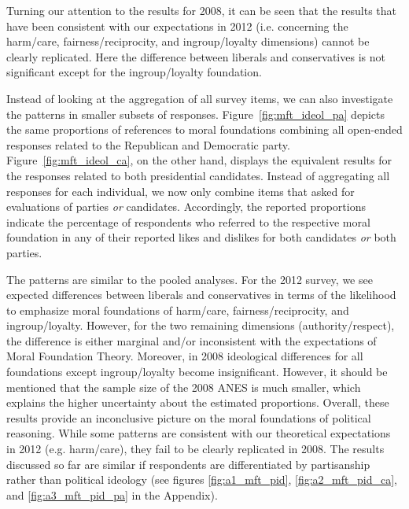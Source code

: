 \documentclass[12pt]{article}
\begin{document}
Turning our attention to the results for 2008, it can be seen that the results that have been consistent with our expectations in 2012 (i.e. concerning the harm/care, fairness/reciprocity, and ingroup/loyalty dimensions) cannot be clearly replicated. Here the difference between liberals and conservatives is not significant except for the ingroup/loyalty foundation.

Instead of looking at the aggregation of all survey items, we can also investigate the patterns in smaller subsets of responses. Figure~\ref{fig:mft_ideol_pa} depicts the same proportions of references to moral foundations combining all open-ended responses related to the Republican and Democratic party. Figure~\ref{fig:mft_ideol_ca}, on the other hand, displays the equivalent results for the responses related to both presidential candidates. Instead of aggregating all responses for each individual, we now only combine items that asked for evaluations of parties \textit{or} candidates. Accordingly, the reported proportions indicate the percentage of respondents who referred to the respective moral foundation in any of their reported likes and dislikes for both candidates \textit{or} both parties.

The patterns are similar to the pooled analyses. For the 2012 survey, we see expected differences between liberals and conservatives in terms of the likelihood to emphasize moral foundations of harm/care, fairness/reciprocity, and ingroup/loyalty. However, for the two remaining dimensions (authority/respect), the difference is either marginal and/or inconsistent with the expectations of Moral Foundation Theory. Moreover, in 2008 ideological differences for all foundations except ingroup/loyalty become insignificant. However, it should be mentioned that the sample size of the 2008 ANES is much smaller, which explains the higher uncertainty about the estimated proportions. Overall, these results provide an inconclusive picture on the moral foundations of political reasoning. While some patterns are consistent with our theoretical expectations in 2012 (e.g. harm/care), they fail to be clearly replicated in 2008. The results discussed so far are similar if respondents are differentiated by partisanship rather than political ideology (see figures \ref{fig:a1_mft_pid}, \ref{fig:a2_mft_pid_ca}, and \ref{fig:a3_mft_pid_pa} in the Appendix).
\end{document}
